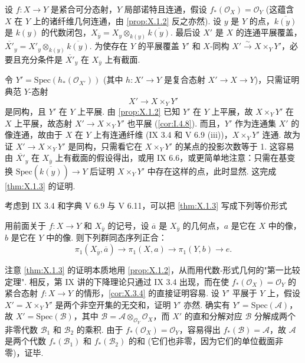\begin{theorem}\label{thm:X.1.3}
设 $f \colon X \to Y$ 是紧合可分态射，$Y$ 局部诺特且连通，假设 $f_*(\mathcal{O}_X) = \mathcal{O}_Y$ (这蕴含 $X$ 在 $Y$ 上的诸纤维几何连通，由 \ref{prop:X.1.2} 反之亦然). 设 $y$ 是 $Y$ 的点，$\overline{k(y)}$ 是 $k(y)$ 的代数闭包，$X_{\overline{y}} = X_y \otimes_{k(y)} \overline{k(y)}$. 最后设 $X'$ 是 $X$ 的连通平展覆盖，$\overline{X'}_y = X'_y \otimes_{k(y)} \overline{k(y)}$. 为使存在 $Y$ 的平展覆盖 $Y'$ 和 $X$-同构 $X' \xrightarrow{\sim} X \times_Y Y'$，必要且充分条件是 $\overline{X'}_y$ 在 $X_{\overline{y}}$ 上有截面.
\end{theorem}

令 $Y' = \mathrm{Spec}(h_*(\mathcal{O}_{X'}))$ (其中 $h \colon X' \to Y$ 是复合态射 $X' \to X \to Y$)，只需证明典范 $Y$-态射
\[
X' \longrightarrow X \times_Y Y'
\]
是同构，且 $Y'$ 在 $Y$ 上平展. 由 \ref{prop:X.1.2} 已知 $Y'$ 在 $Y$ 上平展，故 $X \times_Y Y'$ 在 $X$ 上平展，故态射 $X' \to X \times_Y Y'$ 也平展 (\cref{cor:I.4.8}). 而且，$Y'$ 作为连通集 $X'$ 的像连通，故由于 $X$ 在 $Y$ 上有连通纤维 (IX 3.4 和 V 6.9 (iii))，$X \times_Y Y'$ 连通. 故为证 $X' \to X \times_Y Y'$ 是同构，只需看它在 $X \times_Y Y'$ 的某点的投影次数等于 1. 这容易由 $\overline{X'}_y$ 在 $X_{\overline{y}}$ 上有截面的假设得出，或用 IX 6.6，或更简单地注意：只需在基变换 $\mathrm{Spec}(\overline{k(y)}) \to Y$ 后证明 $X \times_Y Y'$ 中存在这样的点，此时显然. 这完成 \ref{thm:X.1.3} 的证明.

考虑到 IX 3.4 和字典 V 6.9 与 V 6.11，可以把 \ref{thm:X.1.3} 写成下列等价形式

\begin{corollary}\label{cor:X.1.4}
用前面关于 $f \colon X \to Y$ 和 $X_{\overline{y}}$ 的记号，设 $\overline{a}$ 是 $X_{\overline{y}}$ 的几何点，$a$ 是它在 $X$ 中的像，$b$ 是它在 $Y$ 中的像. 则下列群同态序列正合：
\[
\pi_1(X_{\overline{y}}, \overline{a}) \longrightarrow \pi_1(X, a) \longrightarrow \pi_1(Y, b) \longrightarrow e.
\]
\end{corollary}

\begin{remark}\label{rem:X.1.5}
注意 \ref{thm:X.1.3} 的证明本质地用 \ref{prop:X.1.2}，从而用代数-形式几何的"第一比较定理". 相反，第 IX 讲的下降理论只通过 IX 3.4 出现，而在使 $f_*(\mathcal{O}_X) = \mathcal{O}_Y$ 的紧合态射 $f \colon X \to Y$ 的情形，\ref{cor:X.3.4} 的直接证明容易. 设 $Y'$ 平展于 $Y$ 上，假设 $X' = X \times_Y Y'$ 是两个非空开集的无交和，证明 $Y'$ 亦然. 确实有 $Y' = \mathrm{Spec}(\mathcal{A})$，故 $X' = \mathrm{Spec}(\mathcal{B})$，其中 $\mathcal{B} = \mathcal{A} \otimes_{\mathcal{O}_Y} \mathcal{O}_X$，而 $X'$ 的直和分解对应 $\mathcal{B}$ 分解成两个非零代数 $\mathcal{B}_1$ 和 $\mathcal{B}_2$ 的乘积. 由于 $f_*(\mathcal{O}_X) = \mathcal{O}_Y$，容易得出 $f_*(\mathcal{B}) = \mathcal{A}$，故 $\mathcal{A}$ 是两个代数 $f_*(\mathcal{B}_1)$ 和 $f_*(\mathcal{B}_2)$ 的和 (它们也非零，因为它们的单位截面非零)，证毕.
\end{remark}

